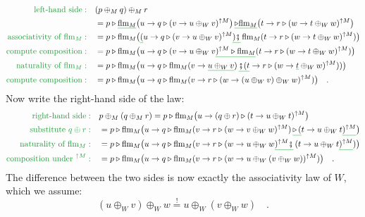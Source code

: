 \begin{align*}
{\color{greenunder}\text{left-hand side}:}\quad & (p\oplus_{M}q)\oplus_{M}r\\
 & =p\triangleright\gunderline{\text{flm}_{M}}\big(u\rightarrow q\triangleright(v\rightarrow u\oplus_{W}v)^{\uparrow M}\big)\,\gunderline{\triangleright\text{flm}_{M}}\big(t\rightarrow r\triangleright(w\rightarrow t\oplus_{W}w)^{\uparrow M}\big)\\
{\color{greenunder}\text{associativity of }\text{flm}_{M}:}\quad & =p\triangleright\text{flm}_{M}\big(\gunderline (u\rightarrow q\triangleright(v\rightarrow u\oplus_{W}v)^{\uparrow M}\gunderline{)\bef}\,\text{flm}_{M}(t\rightarrow r\triangleright(w\rightarrow t\oplus_{W}w)^{\uparrow M})\big)\\
{\color{greenunder}\text{compute composition}:}\quad & =p\triangleright\text{flm}_{M}\big(u\rightarrow q\triangleright(v\rightarrow u\oplus_{W}v\gunderline{)^{\uparrow M}\triangleright\text{flm}_{M}}(t\rightarrow r\triangleright(w\rightarrow t\oplus_{W}w)^{\uparrow M})\big)\\
{\color{greenunder}\text{naturality of }\text{flm}_{M}:}\quad & =p\triangleright\text{flm}_{M}\big(u\rightarrow q\triangleright\text{flm}_{M}(v\rightarrow\gunderline{u\oplus_{W}v})\,\gunderline{\bef(t}\rightarrow r\triangleright(w\rightarrow\gunderline t\oplus_{W}w)^{\uparrow M}))\big)\\
{\color{greenunder}\text{compute composition}:}\quad & =p\triangleright\text{flm}_{M}\big(u\rightarrow q\triangleright\text{flm}_{M}(v\rightarrow r\triangleright(w\rightarrow(u\oplus_{W}v)\oplus_{W}w)^{\uparrow M})\big)\quad.
\end{align*}
Now write the right-hand side of the law:
\begin{align*}
{\color{greenunder}\text{right-hand side}:}\quad & p\oplus_{M}(q\oplus_{M}r)=p\triangleright\text{flm}_{M}\big(u\rightarrow(q\oplus r)\triangleright(t\rightarrow u\oplus_{W}t)^{\uparrow M}\big)\\
{\color{greenunder}\text{substitute }q\oplus r:}\quad & =p\triangleright\text{flm}_{M}\big(u\rightarrow q\triangleright\text{flm}_{M}(v\rightarrow r\triangleright(w\rightarrow v\oplus_{W}w)^{\uparrow M})\,\gunderline{\triangleright\,(}t\rightarrow u\oplus_{W}t\gunderline{)^{\uparrow M}}\big)\\
{\color{greenunder}\text{naturality of }\text{flm}_{M}:}\quad & =p\triangleright\text{flm}_{M}\big(u\rightarrow q\triangleright\text{flm}_{M}(v\rightarrow r\triangleright(w\rightarrow u\oplus_{W}w\gunderline{)^{\uparrow M}\bef}\,(t\rightarrow u\oplus_{W}t\gunderline{)^{\uparrow M}})\big)\\
{\color{greenunder}\text{composition under }^{\uparrow M}:}\quad & =p\triangleright\text{flm}_{M}\big(u\rightarrow q\triangleright\text{flm}_{M}(v\rightarrow r\triangleright(w\rightarrow u\oplus_{W}(v\oplus_{W}w))^{\uparrow M})\big)\quad.
\end{align*}
 The difference between the two sides is now exactly the associativity
law of $W$, which we assume:
\[
(u\oplus_{W}v)\oplus_{W}w\overset{!}{=}u\oplus_{W}(v\oplus_{W}w)\quad.
\]


